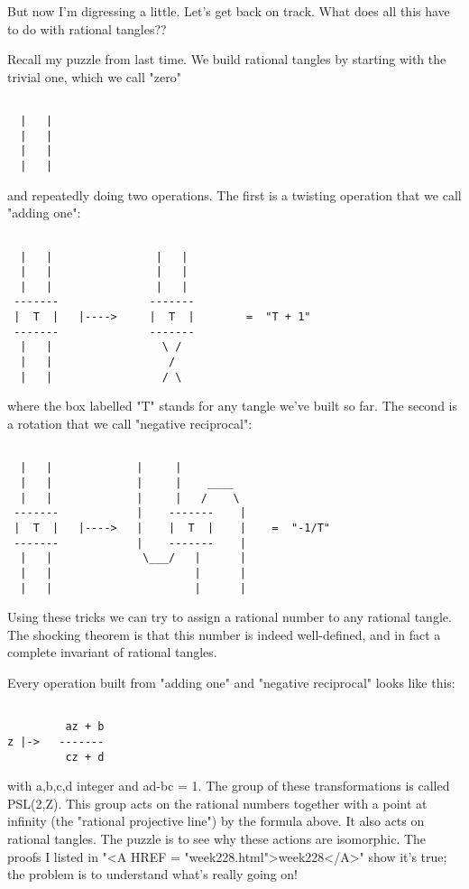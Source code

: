 But now I'm digressing a little.  Let's get back on track.  What 
does all this have to do with rational tangles??

Recall my puzzle from last time.  We build rational tangles by 
starting with the trivial one, which we call "zero"


\begin{verbatim}

  |   |
  |   |
  |   |
  |   |
\end{verbatim}
    
and repeatedly doing two operations.  The first is a twisting 
operation that we call "adding one":

\begin{verbatim}

  |   |                |   |
  |   |                |   |
  |   |                |   |
 -------              -------
 |  T  |   |---->     |  T  |        =  "T + 1"
 -------              -------
  |   |                 \ /
  |   |                  / 
  |   |                 / \
\end{verbatim}
    
where the box labelled "T" stands for any tangle we've built 
so far.  The second is a rotation that we call "negative reciprocal":
 

\begin{verbatim}

  |   |             |     |     
  |   |             |     |    ____
  |   |             |     |   /    \
 -------            |    -------    |
 |  T  |   |---->   |    |  T  |    |    =  "-1/T"
 -------            |    -------    |
  |   |              \___/   |      |
  |   |                      |      |
  |   |                      |      |
\end{verbatim}
    
Using these tricks we can try to assign a rational number to
any rational tangle.  The shocking theorem is that this number
is indeed well-defined, and in fact a complete invariant of 
rational tangles.

Every operation built from "adding one" and 
"negative reciprocal" looks like this:


\begin{verbatim}

         az + b
z |->   -------
         cz + d
\end{verbatim}
    
with a,b,c,d integer and ad-bc = 1.  The group of these transformations 
is called PSL(2,Z).   This group acts on the rational numbers together 
with a point at infinity (the "rational projective line") by the formula 
above.  It also acts on rational tangles.  The puzzle is to see why these
actions are isomorphic.  The proofs I listed in "<A HREF = "week228.html">week228</A>" show it's true;
the problem is to understand what's really going on!

